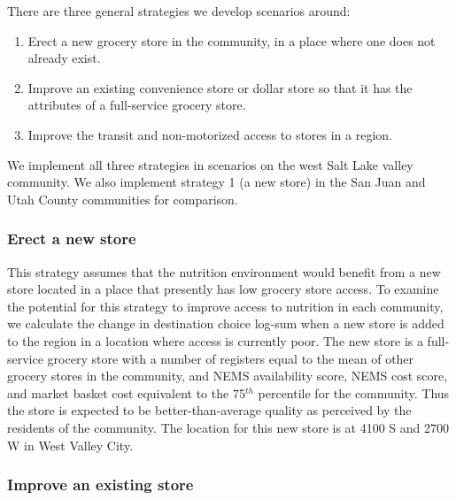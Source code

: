 \documentclass[
  letterpaper,
  authoryear,
  review,
  3p]{elsarticle}
\providecommand{\tightlist}{%
  \setlength{\itemsep}{0pt}\setlength{\parskip}{0pt}}\usepackage{longtable,booktabs,array}
\begin{document}
There are three general strategies we develop scenarios around:

\begin{enumerate}
\def\labelenumi{\arabic{enumi}.}
\tightlist
\item
  Erect a new grocery store in the community, in a place where one does
  not already exist.
\item
  Improve an existing convenience store or dollar store so that it has
  the attributes of a full-service grocery store.
\item
  Improve the transit and non-motorized access to stores in a region.
\end{enumerate}

We implement all three strategies in scenarios on the west Salt Lake
valley community. We also implement strategy 1 (a new store) in the San
Juan and Utah County communities for comparison.

\hypertarget{erect-a-new-store}{%
\subsubsection{Erect a new store}\label{erect-a-new-store}}

This strategy assumes that the nutrition environment would benefit from
a new store located in a place that presently has low grocery store
access. To examine the potential for this strategy to improve access to
nutrition in each community, we calculate the change in destination
choice log-sum when a new store is added to the region in a location
where access is currently poor. The new store is a full-service grocery
store with a number of registers equal to the mean of other grocery
stores in the community, and NEMS availability score, NEMS cost score,
and market basket cost equivalent to the 75\(^{th}\) percentile for the
community. Thus the store is expected to be better-than-average quality
as perceived by the residents of the community. The location for this
new store is at 4100 S and 2700 W in West Valley City.

\hypertarget{improve-an-existing-store}{%
\subsubsection{Improve an existing
store}\label{improve-an-existing-store}}
\end{document}
